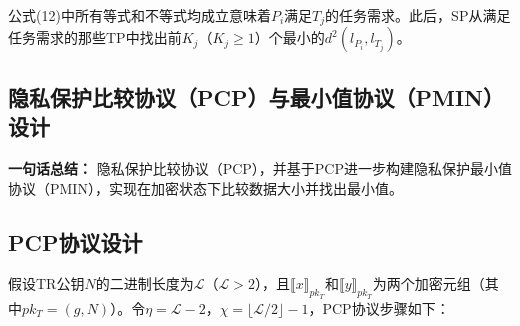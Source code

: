 公式(12)中所有等式和不等式均成立意味着\(P_{i}\)满足\(T_{j}\)的任务需求。此后，SP从满足任务需求的那些TP中找出前\(K_{j}\)（\(K_{j}\geq 1\)）个最小的\(d^{2}(l_{P_{i}},l_{T_{j}})\)。


\subsection{隐私保护比较协议（PCP）与最小值协议（PMIN）设计}
\textbf{一句话总结：}  
隐私保护比较协议（PCP），并基于PCP进一步构建隐私保护最小值协议（PMIN），实现在加密状态下比较数据大小并找出最小值。

\subsection{PCP协议设计}
假设TR公钥\(N\)的二进制长度为\(\mathcal{L}\)（\(\mathcal{L}>2\)），且\(\llbracket x\rrbracket_{pk_{T}}\)和\(\llbracket y\rrbracket_{pk_{T}}\)为两个加密元组（其中\(pk_{T}=(g,N)\)）。令\(\eta=\mathcal{L}-2\)，\(\chi=\lfloor\mathcal{L}/2\rfloor-1\)，PCP协议步骤如下：

